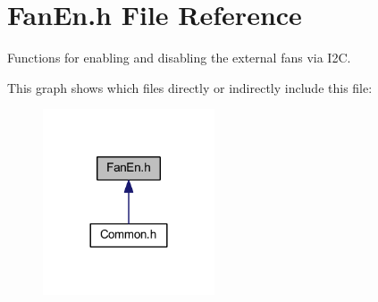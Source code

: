 \hypertarget{a00017}{\section{Fan\-En.\-h File Reference}
\label{a00017}
}


Functions for enabling and disabling the external fans via I2\-C.  


This graph shows which files directly or indirectly include this file\-:\nopagebreak
\begin{figure}[H]
\begin{center}
\leavevmode
\includegraphics[width=144pt]{a00048}
\end{center}
\end{figure}
